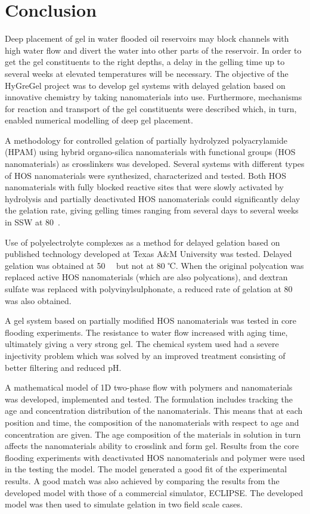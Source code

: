 \documentclass[nanomaterials,article,submit,moreauthors,pdftex]{Definitions/mdpi}
\begin{document}
\section{Conclusion}
Deep placement of gel in water flooded oil reservoirs may block channels with high water flow and divert the water into other parts of the reservoir. In order to get the gel constituents to the right depths, a delay in the gelling time up to several weeks at elevated temperatures will be necessary. The objective of the HyGreGel project was to develop gel systems with delayed gelation based on innovative chemistry by taking nanomaterials into use. Furthermore, mechanisms for reaction and transport of the gel constituents were described which, in turn, enabled numerical modelling of deep gel placement.

A methodology for controlled gelation of partially hydrolyzed polyacrylamide (HPAM) using hybrid organo-silica nanomaterials with functional groups (HOS nanomaterials) as crosslinkers was developed. Several systems with different types of HOS nanomaterials were synthesized, characterized and tested. Both HOS nanomaterials with fully blocked reactive sites that were slowly activated by hydrolysis and partially deactivated HOS nanomaterials could significantly delay the gelation rate, giving gelling times ranging from several days to several weeks in SSW at 80~\celsius.

Use of polyelectrolyte complexes as a method for delayed gelation based on published
technology developed at Texas A\&M University was tested. Delayed gelation was obtained at 50~\celsius~ but not at 80 ℃. When the original polycation was replaced  
active HOS nanomaterials (which are also polycations), and dextran sulfate was replaced with polyvinylsulphonate, a reduced rate of gelation at 80~\celsius~ was also obtained.  

A gel system based on partially modified HOS nanomaterials was tested in core flooding experiments. The resistance to water flow increased with aging time, ultimately giving a very strong gel. The chemical system used had a severe injectivity problem which was solved by an improved treatment consisting of better filtering and reduced pH.

A mathematical model of 1D two-phase flow with polymers and nanomaterials was developed, implemented and tested. The formulation includes tracking the age and concentration distribution of the nanomaterials. This means that at each position and time, the composition of the nanomaterials with respect to age and concentration are given. The age composition of the materials in solution in turn affects the nanomaterials ability to crosslink and form gel. Results from the core flooding experiments with deactivated HOS nanomaterials and polymer were used in the testing the model. The model generated a good fit of the experimental results. A good match was also achieved by comparing the results from the developed model with those of a commercial simulator, ECLIPSE. The developed model was then used to simulate gelation in two field scale cases.
\end{document}

